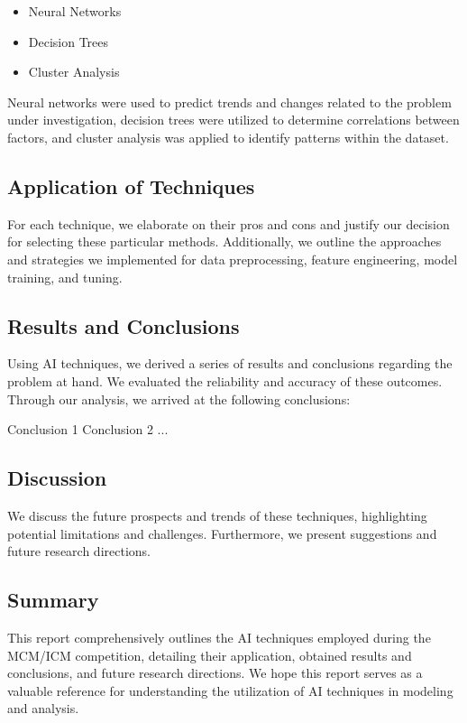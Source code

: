 \documentclass{mcmthesis}
\begin{document}
\begin{itemize}
\item Neural Networks
\item Decision Trees
\item Cluster Analysis
\end{itemize}

Neural networks were used to predict trends and changes related to the problem under investigation, decision trees were utilized to determine correlations between factors, and cluster analysis was applied to identify patterns within the dataset.

\subsection*{Application of Techniques}

For each technique, we elaborate on their pros and cons and justify our decision for selecting these particular methods. Additionally, we outline the approaches and strategies we implemented for data preprocessing, feature engineering, model training, and tuning.

\subsection*{Results and Conclusions}

Using AI techniques, we derived a series of results and conclusions regarding the problem at hand. We evaluated the reliability and accuracy of these outcomes. Through our analysis, we arrived at the following conclusions:

Conclusion 1
Conclusion 2
...

\subsection*{Discussion}

We discuss the future prospects and trends of these techniques, highlighting potential limitations and challenges. Furthermore, we present suggestions and future research directions.

\subsection*{Summary}

This report comprehensively outlines the AI techniques employed during the MCM/ICM competition, detailing their application, obtained results and conclusions, and future research directions. We hope this report serves as a valuable reference for understanding the utilization of AI techniques in modeling and analysis.

\clearpage
\setcounter{page}{\value{lastpage}}
\end{document}
